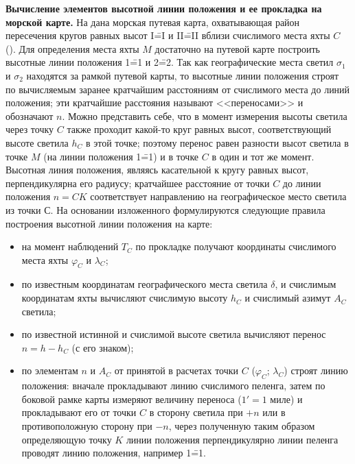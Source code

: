 \textbf{Вычисление элементов высотной линии положения и ее прокладка
  на морской карте.} На  дана морская путевая карта,
охватывающая район пересечения кругов равных высот I\==I и II\==II
вблизи счислимого места яхты $C$ (). Для определения места
яхты $M$ достаточно на путевой карте построить высотные линии
положения 1\==1 и 2\==2. Так как географические места светил
$\sigma_1$ и $\sigma_2$ находятся за рамкой путевой карты, то высотные
линии положения строят по вычисляемым заранее кратчайшим расстояниям
от счислимого места до линий положения; эти кратчайшие расстояния
называют <<переносами>> и обозначают $n$. Можно представить себе, что в
момент измерения высоты светила через точку $C$ также проходит какой-то
круг равных высот, соответствующий высоте светила $h_C$ в этой точке;
поэтому перенос равен разности высот светила в точке $M$ (на линии
положения 1\==1) и в точке $C$ в один и тот же момент. Высотная линия
положения, являясь касательной к кругу равных высот, перпендикулярна
его радиусу; кратчайшее расстояние от точки $C$ до линии положения
$n = CK$ соответствует направлению на географическое место светила из точки
С. На основании изложенного формулируются следующие правила построения
высотной линии положения на карте:
\begin{itemize}
\item на момент наблюдений $T_C$ по прокладке получают координаты
  счислимого места яхты $\varphi_C$ и $\lambda_C$;
\item по известным координатам географического места светила $\delta$, \tGR и
  счислимым координатам яхты вычисляют счислимую высоту $h_C$ и счислимый
  азимут $A_C$ светила;
\item по известной истинной и счислимой высоте светила вычисляют
  перенос $n = h - h_C$ (с его знаком);
\item по элементам $n$ и $A_C$ от принятой в расчетах точки $C$
  ($\varphi_C$; $\lambda_C$) строят линию положения: вначале
  прокладывают линию счислимого пеленга, затем по боковой рамке карты
  измеряют величину переноса ($1' = 1$ миле) и прокладывают его от
  точки $C$ в сторону светила при $+n$ или в противоположную сторону
  при $-n$, через полученную таким образом определяющую точку $K$
  линии положения перпендикулярно линии пеленга проводят линию
  положения, например 1\==1.
\end{itemize}

